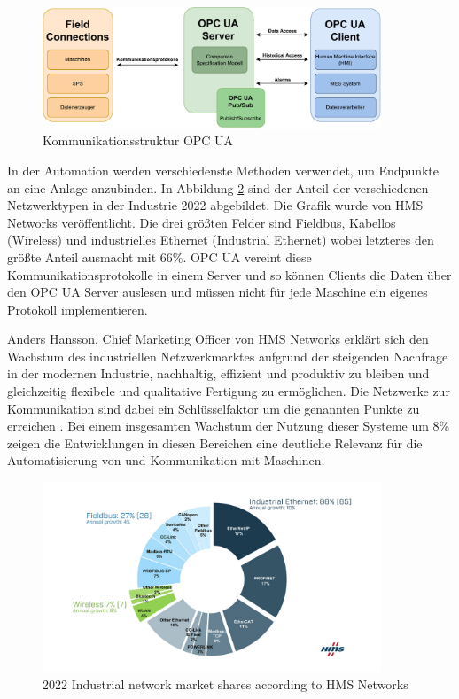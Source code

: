 \documentclass[a4paper, 12pt, oneside, toc=listofnumbered, bibliography=totoc]{scrbook}
\begin{document}
		\begin{figure}[H]
			\centering
			\includegraphics[width=0.9\textwidth]{res/diagramms/OPCUA.pdf}
			\caption{Kommunikationsstruktur OPC UA}
			\label{fig:OPCUA_Structure}
		\end{figure}
		
		In der Automation werden verschiedenste Methoden verwendet, um Endpunkte an eine Anlage anzubinden. In Abbildung \ref{fig:share} sind der Anteil der verschiedenen Netzwerktypen in der Industrie 2022 abgebildet. Die Grafik wurde von HMS Networks veröffentlicht. Die drei größten Felder sind Fieldbus, Kabellos (Wireless) und industrielles Ethernet (Industrial Ethernet) wobei letzteres den größte Anteil ausmacht mit 66\%. OPC UA vereint diese Kommunikationsprotokolle in einem Server und so können Clients die Daten über den OPC UA Server auslesen und müssen nicht für jede Maschine ein eigenes Protokoll implementieren. \cite{noauthor_2022_nodate}
		
		Anders Hansson, Chief Marketing Officer von HMS Networks erklärt sich den Wachstum des industriellen Netzwerkmarktes aufgrund der steigenden Nachfrage in der modernen Industrie, nachhaltig, effizient und produktiv zu bleiben und gleichzeitig flexibele und qualitative Fertigung zu ermöglichen. Die Netzwerke zur Kommunikation sind dabei ein Schlüsselfaktor um die genannten Punkte zu erreichen \cite{noauthor_2022_nodate}. Bei einem insgesamten Wachstum der Nutzung dieser Systeme um 8\% zeigen die Entwicklungen in diesen Bereichen eine deutliche Relevanz für die Automatisierung von und Kommunikation mit Maschinen. 
		
		\begin{figure}[H]
			\centering
			\includegraphics[width=0.9\textwidth]{res/network-shares.png}
			\caption{2022 Industrial network market shares according to HMS Networks \cite{noauthor_2022_nodate}} 
			\label{fig:share}
		\end{figure}
	
\end{document}
